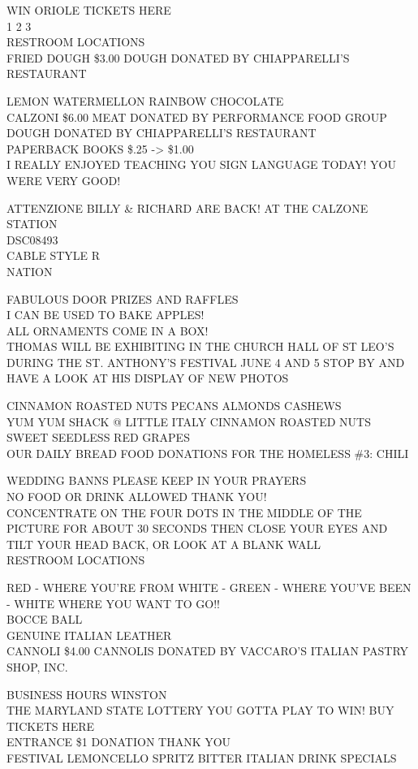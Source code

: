 \documentclass[10pt,letterpaper]{article}
\begin{document}
WIN ORIOLE TICKETS HERE\\
1 2 3\\
RESTROOM LOCATIONS\\
FRIED DOUGH \$3.00 DOUGH DONATED BY CHIAPPARELLI'S RESTAURANT

LEMON WATERMELLON RAINBOW CHOCOLATE\\
CALZONI \$6.00 MEAT DONATED BY PERFORMANCE FOOD GROUP DOUGH DONATED BY CHIAPPARELLI'S RESTAURANT\\
PAPERBACK BOOKS \$.25 {-}> \$1.00\\
I REALLY ENJOYED TEACHING YOU SIGN LANGUAGE TODAY!  YOU WERE VERY GOOD!

ATTENZIONE BILLY \& RICHARD ARE BACK! AT THE CALZONE STATION\\
DSC08493\\
CABLE STYLE R\\
NATION

FABULOUS DOOR PRIZES AND RAFFLES\\
I CAN BE USED TO BAKE APPLES!\\
ALL ORNAMENTS COME IN A BOX!\\
THOMAS WILL BE EXHIBITING IN THE CHURCH HALL OF ST LEO'S DURING THE ST. ANTHONY'S FESTIVAL JUNE 4 AND 5 STOP BY AND HAVE A LOOK AT HIS DISPLAY OF NEW PHOTOS

CINNAMON ROASTED NUTS PECANS ALMONDS CASHEWS\\
YUM YUM SHACK @ LITTLE ITALY CINNAMON ROASTED NUTS\\
SWEET SEEDLESS RED GRAPES\\
OUR DAILY BREAD FOOD DONATIONS FOR THE HOMELESS \#3: CHILI

WEDDING BANNS PLEASE KEEP IN YOUR PRAYERS\\
NO FOOD OR DRINK ALLOWED THANK YOU!\\
CONCENTRATE ON THE FOUR DOTS IN THE MIDDLE OF THE PICTURE FOR ABOUT 30 SECONDS THEN CLOSE YOUR EYES AND TILT YOUR HEAD BACK, OR LOOK AT A BLANK WALL\\
RESTROOM LOCATIONS

RED {-} WHERE YOU'RE FROM WHITE {-} GREEN {-} WHERE YOU'VE BEEN {-} WHITE WHERE YOU WANT TO GO!!\\
BOCCE BALL\\
GENUINE ITALIAN LEATHER\\
CANNOLI \$4.00 CANNOLIS DONATED BY VACCARO'S ITALIAN PASTRY SHOP, INC.

BUSINESS HOURS WINSTON\\
THE MARYLAND STATE LOTTERY YOU GOTTA PLAY TO WIN!  BUY TICKETS HERE\\
ENTRANCE \$1 DONATION THANK YOU\\
FESTIVAL LEMONCELLO SPRITZ BITTER ITALIAN DRINK SPECIALS
\end{document}
